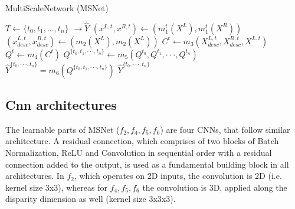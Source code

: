 \documentclass[runningheads]{llncs}
\begin{document}

\begin{algorithm}
\caption{MultiScaleNetwork (MSNet)}\label{alg:MSNET}
\begin{algorithmic}[1]
\State $T \gets \{ t_0, t_1, ... , t_n\}$ 
 $\rightarrow \hat{Y}$ 
\State $(x^{L,t},  x^{R,t}) \gets (m_1^t(X^L),m_1^t(X^R)) $ 
\State $(x^{L,t}_{desc}, x^{R,t}_{desc}) \gets (m_2(X^L), m_2(X^L))$ 
\State $C^{t} \gets m_3(X^{L,t}_{desc}, X^{R,t}_{desc}, X^{L,t})$ 
\State $Q^{t} \gets m_4(C^{t})$ 
\EndFor
\State $Q^{\{t_0, t_1, \cdot \cdot \cdot, t_n\}} \gets m_5(Q^{t_0}, Q^{t_1}, \cdot \cdot \cdot, Q^{t_n})$ 
\State $\hat{Y}^{\{ t_0, \cdot \cdot \cdot, t_n \}} = m_6(Q^{\{t_0, t_1, \cdot \cdot \cdot, t_n\}}) $ 
\State \Return $\hat{Y}^{\{ t_0, \cdot \cdot \cdot, t_n \}} $
\EndProcedure
\end{algorithmic}
\end{algorithm}

\subsection*{Cnn architectures}

The learnable parts of MSNet ($f_2, f_4, f_5, f_6$) are four CNNs, that follow similar architecture. A residual connection, which comprises of two blocks of Batch Normalization, ReLU and Convolution in sequential order with a residual connection added to the output, is used as a fundamental building block in all architectures. In $f_2$, which operates on 2D inputs, the convolution is 2D (i.e. kernel size 3x3), whereas for $f_4, f_5, f_6$ the convolution is 3D, applied along the disparity dimension as well (kernel size 3x3x3).
\end{document}
